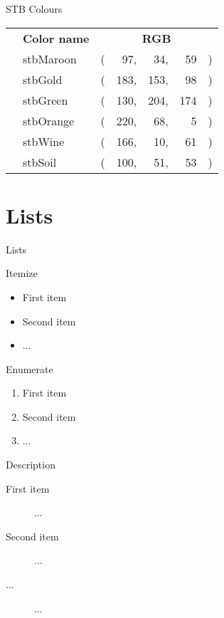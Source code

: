 \documentclass[xcolor={svgnames,table},10pt,fleqn]{beamer}
\begin{document}
\begin{frame}{STB Colours}
\begin{center}
\begin{tabular}{llr@{}r@{ }r@{ }r@{}r@{}}
 & \textbf{Color name} & \multicolumn{5}{c}{\textbf{RGB}} \\[0.25ex]
 \cmidrule(lr){2-2}
 \cmidrule(l){3-7}
\colorbox{stbMaroon}{\phantom{XXXXX}} & {stbMaroon} &(&  97,&  34,&  59&) \\[0.25ex]
\colorbox{stbGold}  {\phantom{XXXXX}} & {stbGold}   &(& 183,& 153,&  98&) \\[0.25ex]
\colorbox{stbGreen} {\phantom{XXXXX}} & {stbGreen}  &(& 130,& 204,& 174&) \\[0.25ex]
\colorbox{stbOrange}{\phantom{XXXXX}} & {stbOrange} &(& 220,&  68,&   5&) \\[0.25ex]
\colorbox{stbWine}  {\phantom{XXXXX}} & {stbWine}   &(& 166,&  10,&  61&) \\[0.25ex]
\colorbox{stbSoil}  {\phantom{XXXXX}} & {stbSoil}   &(& 100,&  51,&  53&) \\
\end{tabular}
\end{center}
\end{frame}


\section{Lists}
\begin{frame}{Lists}
\begin{block}{Itemize}
\begin{itemize}
    \item First item
    \item Second item
    \item ...
\end{itemize}
\end{block}
\begin{block}{Enumerate}
\begin{enumerate}
    \item First item
    \item Second item
    \item ...
\end{enumerate}
\end{block}
\begin{block}{Description}
\begin{description}
    \item[First item] ...
    \item[Second item] ...
    \item [...] ...
\end{description}
\end{block}

\end{frame}
\end{document}
